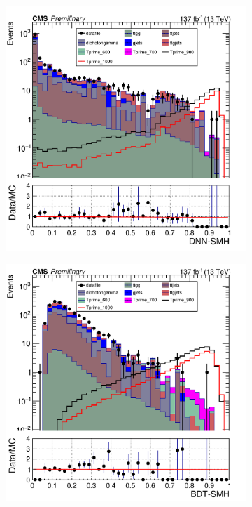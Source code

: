 \begin{figure}[H]
     \centering
     \begin{subfigure}[b]{0.47\textwidth}
         \centering
         \includegraphics[width=\textwidth]{figure_4/Stacked_plot_DNN_800-1000_with_diphoton_cuts_scaled_inputs.pdf}
         \label{fig:y equals x}
     \end{subfigure}
     \hfill
     \begin{subfigure}[b]{0.47\textwidth}
         \centering
         \includegraphics[width=\textwidth]{BDT_Output/Stacked_plot_BDT_800-1000_with_diphoton_cuts_with_Scaled_inputs.pdf}

\end{subfigure}
\end{figure}
